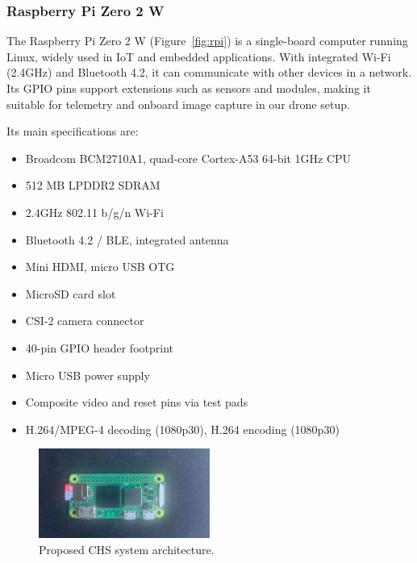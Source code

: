 \subsubsection*{Raspberry Pi Zero 2 W}

The Raspberry Pi Zero 2 W (Figure~\ref{fig:rpi}) is a single-board computer running Linux, 
widely used in IoT and embedded applications. With integrated Wi-Fi (2.4GHz) and Bluetooth 4.2, 
it can communicate with other devices in a network. Its GPIO pins support extensions such as sensors 
and modules, making it suitable for telemetry and onboard image capture in our drone setup.  

Its main specifications are:  
\begin{itemize}
    \item Broadcom BCM2710A1, quad-core Cortex-A53 64-bit 1GHz CPU  
    \item 512 MB LPDDR2 SDRAM  
    \item 2.4GHz 802.11 b/g/n Wi-Fi  
    \item Bluetooth 4.2 / BLE, integrated antenna  
    \item Mini HDMI, micro USB OTG  
    \item MicroSD card slot  
    \item CSI-2 camera connector  
    \item 40-pin GPIO header footprint  
    \item Micro USB power supply  
    \item Composite video and reset pins via test pads  
    \item H.264/MPEG-4 decoding (1080p30), H.264 encoding (1080p30)  
\end{itemize}

\begin{figure}[H]  
    \centering
    \includegraphics[width=0.5\textwidth]{Figures/Chapter5/Section2/pi2w.png} %
    \caption{Proposed CHS system architecture.}
    \label{fig:proposed_architecture} %
\end{figure}

